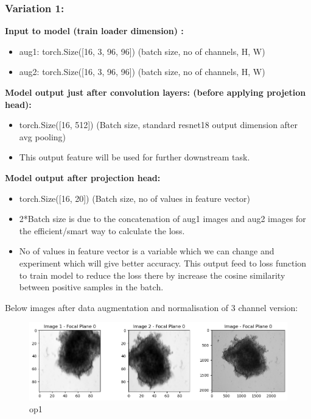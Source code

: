 \documentclass[a4paper,12pt]{report}
\begin{document}
\subsubsection{Variation 1:}
\textbf{Input to model (train loader dimension) :} 

\begin{itemize}
  \item aug1: torch.Size([16, 3, 96, 96])        (batch size, no of channels, H, W)
  \item aug2: torch.Size([16, 3, 96, 96])        (batch size, no of channels, H, W) \vspace{1em}
\end{itemize}

\textbf{Model output just after convolution layers: (before applying projetion head):} 
\begin{itemize}
  \item torch.Size([16, 512]) (Batch size, standard resnet18 output dimension after avg pooling)   
  \item This output feature will be used for further downstream task.  \vspace{1em}
\end{itemize}
\textbf{Model output after projection head:} 
\begin{itemize}
  \item torch.Size([16, 20])  (Batch size, no of values in feature vector)  

  \item 2*Batch size is due to the concatenation of aug1 images and aug2 images for the efficient/smart way to calculate the loss. 

  \item No of values in feature vector is a variable which we can change and experiment which will give better accuracy. This output feed to loss function to train model to reduce the loss there by increase the cosine similarity between positive samples in the batch.
\end{itemize}
Below images after data augmentation and normalisation of 3 channel version:

  \begin{figure}[H]
    \centering
    \includegraphics[width=0.9\linewidth]{figures/op1.png} %
    \caption{op1}
    \label{fig:out_2}
  \end{figure}
\end{document}
